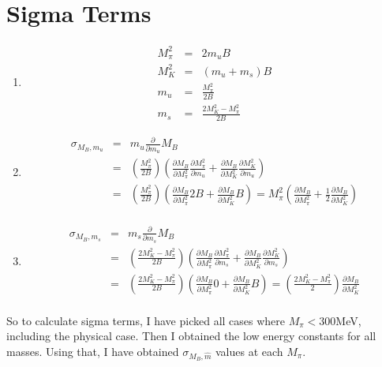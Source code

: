 \documentclass[10pt,a4paper]{article}
\begin{document}
\section{Sigma Terms}
\begin{enumerate}
	\item \begin{eqnarray}
	M_\pi^2 &=& 2 m_u B \nonumber \\
	M_K^2 &=&  (m_u + m_s) B \nonumber \\
	m_u &=& \frac{M_\pi^2}{2 B}  \\
	m_s &=& \frac{2 M_K^2 - M_\pi^2}{2 B} \nonumber
	\end{eqnarray}
	\item \begin{eqnarray}
	\sigma_{M_B,m_u}&=&m_u \frac{\partial}{\partial m_u}M_B \nonumber \\
	&=& \left(\frac{M_\pi^2}{2B}\right)\left(\frac{\partial M_B }{\partial M_\pi^2}\frac{\partial M_\pi^2}{\partial m_u}+\frac{\partial M_B }{\partial M_K^2}\frac{\partial M_K^2}{\partial m_u}\right) \nonumber \\
	&=& \left(\frac{M_\pi^2}{2B}\right)\left(\frac{\partial M_B }{\partial M_\pi^2} 2 B + \frac{\partial M_B }{\partial M_K^2}  B\right) = M_\pi^2 \left( \frac{\partial M_B }{\partial M_\pi^2}+\frac{1}{2}\frac{\partial M_B }{\partial M_K^2} \right) \nonumber \\
	\end{eqnarray}
	\item \begin{eqnarray}
	\sigma_{M_B,m_s}&=&m_s \frac{\partial}{\partial m_s}M_B \nonumber \\
	&=& \left(\frac{2M_K^2-M_\pi^2}{2B}\right)\left(\frac{\partial M_B }{\partial M_\pi^2}\frac{\partial M_\pi^2}{\partial m_s} + \frac{\partial M_B }{\partial M_K^2}\frac{\partial M_K^2}{\partial m_s}\right) \nonumber \\
	&=& \left(\frac{2M_K^2-M_\pi^2}{2B}\right)\left(\frac{\partial M_B }{\partial M_\pi^2}0 + \frac{\partial M_B }{\partial M_K^2}B\right) = \left(\frac{2M_K^2-M_\pi^2}{2}\right)\frac{\partial M_B }{\partial M_K^2} \nonumber \\
	\end{eqnarray}
\end{enumerate}

So to calculate sigma terms, I have picked all cases where $M_\pi<300$MeV, including the physical case. Then I obtained the low energy constants for all masses. Using that, I have obtained $\sigma_{M_B,\hat{m}}$ values at each $M_\pi$. 
\end{document}
